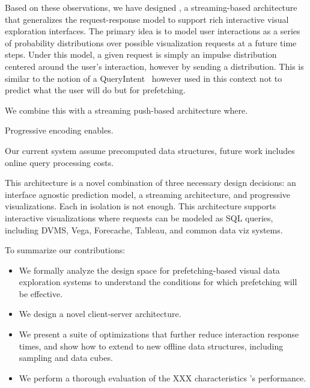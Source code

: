 Based on these observations, we have designed \sys, a streaming-based architecture that generalizes the request-response model to support rich interactive visual exploration interfaces.  The primary idea is to model user interactions as a series of probability distributions over possible visualization requests at a future time steps.  Under this model, a given request is simply an impulse distribution centered around the user's interaction, however by sending a distribution.  This is similar to the notion of a QueryIntent~\cite{ebenstein2016fluxquery} however used in this context not to predict what the user will do but for prefetching.


We combine this with a streaming push-based architecture where.

Progressive encoding enables.

Our current system assume precomputed data structures, future work includes online query processing costs.

This architecture is a novel combination of three necessary design decisions: an interface agnostic prediction model, a streaming architecture, and progressive visualizations.  Each in isolation is not enough.   This architecture supports interactive visualizations where requests can be modeled as SQL queries, including DVMS, Vega, Forecache, Tableau, and common data viz systems.

To summarize our contributions:

\begin{itemize}[leftmargin=*, topsep=0mm, itemsep=0mm]

\item We formally analyze the design space for prefetching-based visual data exploration systems to understand the conditions for which prefetching will be effective.

\item We design a novel client-server architecture.

\item We present a suite of optimizations that further reduce interaction response times, and show how to extend to new offline data structures, including sampling and data cubes.

\item We perform a thorough evaluation of the XXX characteristics \sys's performance.  

\end{itemize}
